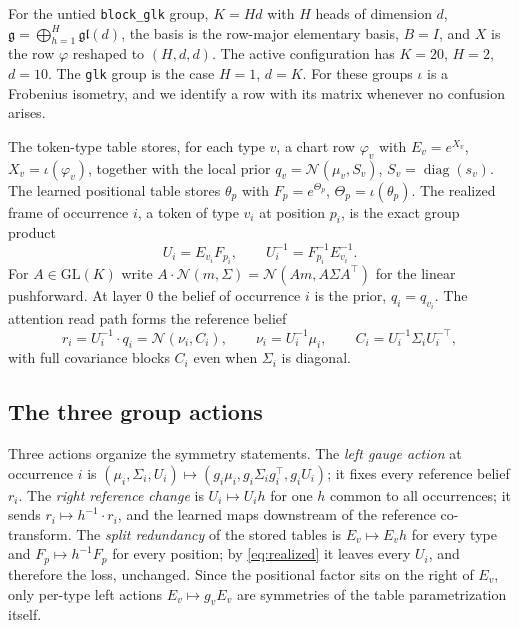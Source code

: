 \documentclass[11pt]{article}
\theoremstyle{definition}
\theoremstyle{remark}
\newcommand{\g}{\mathfrak{g}}
\newcommand{\gl}{\mathfrak{gl}}
\newcommand{\GL}{\mathrm{GL}}
\newcommand{\Normal}{\mathcal{N}}
\begin{document}
For the untied \texttt{block\_glk} group, $K=Hd$ with $H$ heads of dimension $d$, $\g=\bigoplus_{h=1}^{H}\gl(d)$, the basis is the row-major elementary basis, $B=I$, and $X$ is the row $\varphi$ reshaped to $(H,d,d)$. The active configuration has $K=20$, $H=2$, $d=10$. The \texttt{glk} group is the case $H=1$, $d=K$. For these groups $\iota$ is a Frobenius isometry, and we identify a row with its matrix whenever no confusion arises.

The token-type table stores, for each type $v$, a chart row $\varphi_v$ with $E_v=e^{X_v}$, $X_v=\iota(\varphi_v)$, together with the local prior $q_v=\Normal(\mu_v,S_v)$, $S_v=\operatorname{diag}(s_v)$. The learned positional table stores $\theta_p$ with $F_p=e^{\Theta_p}$, $\Theta_p=\iota(\theta_p)$. The realized frame of occurrence $i$, a token of type $v_i$ at position $p_i$, is the exact group product
\begin{equation}\label{eq:realized}
U_i=E_{v_i}F_{p_i},\qquad U_i^{-1}=F_{p_i}^{-1}E_{v_i}^{-1}.
\end{equation}
For $A\in\GL(K)$ write $A\cdot\Normal(m,\Sigma)=\Normal(Am,A\Sigma A^\top)$ for the linear pushforward. At layer $0$ the belief of occurrence $i$ is the prior, $q_i=q_{v_i}$. The attention read path forms the reference belief
\begin{equation}\label{eq:reference}
r_i=U_i^{-1}\cdot q_i=\Normal(\nu_i,C_i),\qquad \nu_i=U_i^{-1}\mu_i,\qquad C_i=U_i^{-1}\Sigma_iU_i^{-\top},
\end{equation}
with full covariance blocks $C_i$ even when $\Sigma_i$ is diagonal.

\subsection{The three group actions}

Three actions organize the symmetry statements. The \emph{left gauge action} at occurrence $i$ is $(\mu_i,\Sigma_i,U_i)\mapsto(g_i\mu_i,g_i\Sigma_ig_i^\top,g_iU_i)$; it fixes every reference belief $r_i$. The \emph{right reference change} is $U_i\mapsto U_ih$ for one $h$ common to all occurrences; it sends $r_i\mapsto h^{-1}\cdot r_i$, and the learned maps downstream of the reference co-transform. The \emph{split redundancy} of the stored tables is $E_v\mapsto E_vh$ for every type and $F_p\mapsto h^{-1}F_p$ for every position; by \eqref{eq:realized} it leaves every $U_i$, and therefore the loss, unchanged. Since the positional factor sits on the right of $E_v$, only per-type left actions $E_v\mapsto g_vE_v$ are symmetries of the table parametrization itself.
\end{document}
